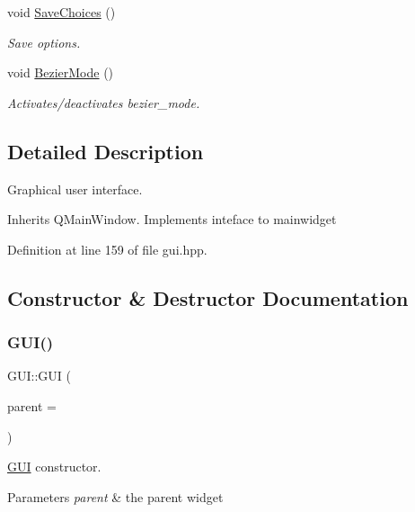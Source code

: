 \begin{DoxyCompactItemize}
void \mbox{\hyperlink{classGUI_a00fb847ea0a8249acaaf70c0f3ba3fd4}{Save\+Choices}} ()
\begin{DoxyCompactList}\small\item\em Save options. \end{DoxyCompactList}\item 
\mbox{\label{classGUI_ac0cb178a0a36573f7d99a104dd84f5ed}} 
void \mbox{\hyperlink{classGUI_ac0cb178a0a36573f7d99a104dd84f5ed}{Bezier\+Mode}} ()
\begin{DoxyCompactList}\small\item\em Activates/deactivates bezier\+\_\+mode. \end{DoxyCompactList}\end{DoxyCompactItemize}


\subsection{Detailed Description}
Graphical user interface. 

Inherits Q\+Main\+Window. Implements inteface to mainwidget 

Definition at line 159 of file gui.\+hpp.



\subsection{Constructor \& Destructor Documentation}
\mbox{\label{classGUI_acb0ba8c6fc121d814d30560e2c29f2fe}} 
\subsubsection{\texorpdfstring{G\+U\+I()}{GUI()}}
{\footnotesize\ttfamily G\+U\+I\+::\+G\+UI (\begin{DoxyParamCaption}\item[{Q\+Widget $\ast$}]{parent = {} }\end{DoxyParamCaption})}



\mbox{\hyperlink{classGUI}{G\+UI}} constructor. 


\begin{DoxyParams}{Parameters}
{\em parent} & the parent widget \\
\hline
\end{DoxyParams}


